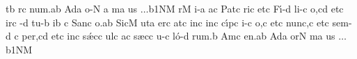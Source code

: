\spatium
\sgn {}{\ae}t\punctum b\egn
{}r\punctum c\egn
\sgn nu{m.}\punctum a\augmentum b\egn
\spatium
\divisiofinalis
\spatium
{}Ad\punctum a\egn
\sgn {}o-\punctum N\egn
\custos a
\lineaproxima
{}m\punctum a\egn
\sgn {}u{s $\ldots$}\episem b1\clivis NM\egn
\spatium
\divisiofinalis
\spatium
{}r\punctum M\egn
\sgn {}i-\punctum a\egn
\sgn {}a{}\punctum c\egn
\spatium
\sgn Pat\punctum c\egn
\sgn ri{}\punctum c\egn
\spatium
\sgn {}et\punctum c\egn
\spatium
\sgn F{\'\i}-\punctum d\egn
\sgn li-\punctum c\egn
\sgn {}o,\punctum c\augmentum d\egn
\spatium
\divisiomaior
\spatium
\sgn { }et\punctum c\egn
\spatium
{}ir\punctum c\egn
\sgn {}{\'\i}-\punctum d\egn
\sgn tu-\punctum b\egn
\sgn {}i{}\punctum b\egn
\spatium
\custos c
\lineaproxima
\sgn S{a}n\punctum c\egn
{}o.\punctum a\augmentum b\egn
\spatium
\divisiofinalis
\spatium
\sgn Si{c}\punctum M\egn
\sgn {}ut\punctum a\egn
\spatium
\sgn {}er\engl{}\punctum c\egn
\sgn {}at\punctum c\egn
\spatium
\sgn {}in\punctum c\egn
\spatium
{}in\punctum c\egn
\sgn c{\'\i}p\punctum c\egn
\sgn {}i-\punctum c\egn
\sgn {}o{,}\punctum c\egn
\spatium
\sgn { }et\punctum c\egn
\spatium
\sgn nu{nc,}\punctum c\egn
\spatium
\sgn {}et\punctum c\egn
\spatium
\sgn se{m-}\punctum d\egn
\custos c
\lineaproxima
\sgn pe{r,}\punctum c\augmentum d\egn
\spatium
\divisiomaior
\spatium
\sgn { }et\punctum c\egn
\spatium
\sgn {}in\punctum c\egn
\spatium
\sgn s{\'\ae}c\punctum c\egn
\sgn {}ul\punctum c\egn
\sgn {}a{}\punctum c\egn
\spatium
\sgn s{\ae}c\punctum c\egn
\sgn {}u-\punctum c\egn
\sgn l{\'o}-\punctum d\egn
\sgn ru{m.}\punctum b\egn
\spatium
\sgn {}Am\punctum c\egn
\sgn {}e{n.}\punctum a\augmentum b\egn
\spatium
\divisiofinalis
\spatium
\sgn {}Ad\punctum a\egn
\sgn {}or\punctum N\egn
{}m\punctum a\egn
\sgn {}u{s $\ldots$}\episem b1\clivis NM\egn
\spatium
\Finisgregoriana

